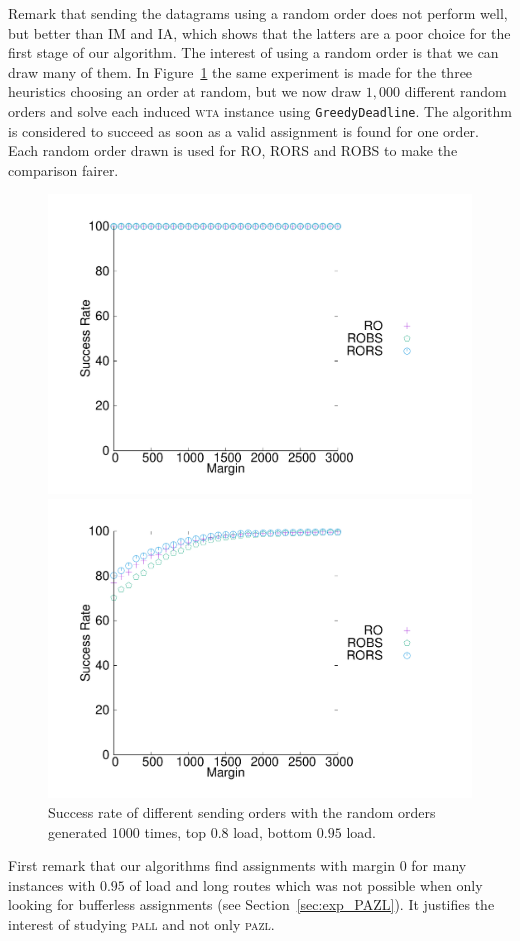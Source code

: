\documentclass[a4paper,10pt]{journal}
\newcommand\greedydeadline{\texttt{GreedyDeadline}\xspace}
\newcommand\pazl{\textsc{pazl}\xspace}
\newcommand\pall{\textsc{pall}\xspace}
\newcommand\wta{\textsc{wta}\xspace}
\begin{document}
     Remark that sending the datagrams using a random order does not perform well,
     but better than IM and IA, which shows that the latters are a poor choice for the first stage of our algorithm. The interest of using a random order is that we can draw many of them. In Figure~\ref{fig:success1000random} the same experiment is made for the three heuristics choosing an order at random, but we now draw $1,000$ different random orders and solve each induced \wta instance using \greedydeadline. The algorithm is considered to succeed as soon as a valid assignment is found for one order. Each random order drawn is used for RO, RORS and ROBS to make the comparison fairer.

\begin{figure}[h] 
  \centering
  \includegraphics[width=0.7\linewidth]{departs_gp_25000.pdf}

    \includegraphics[width=0.7\linewidth]{departs_gp_21000.pdf}
    
       \caption{Success rate of different sending orders with the random orders generated $1000$ times, top $0.8$ load, bottom $0.95$ load.}
      \label{fig:success1000random}
          \end{figure}

 First remark that our algorithms find assignments with margin $0$ for many instances with $0.95$ of load and long routes which was not possible when only looking for bufferless assignments (see Section~\ref{sec:exp_PAZL}). It justifies the interest of studying \pall and not only \pazl.
  
\end{document}
